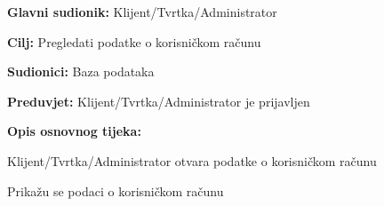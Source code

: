 \noindent {}
\begin{packed_item}
	
	\item \textbf{Glavni sudionik:} Klijent/Tvrtka/Administrator
	\item \textbf{Cilj:} Pregledati podatke o korisničkom računu
	\item \textbf{Sudionici:} Baza podataka
	\item \textbf{Preduvjet:} Klijent/Tvrtka/Administrator je prijavljen
	\item \textbf{Opis osnovnog tijeka:}
	
	\item[] \begin{packed_enum}
		
		\item Klijent/Tvrtka/Administrator otvara podatke o korisničkom računu
		\item Prikažu se podaci o korisničkom računu
	
	\end{packed_enum}
	
\end{packed_item}

\pagebreak

